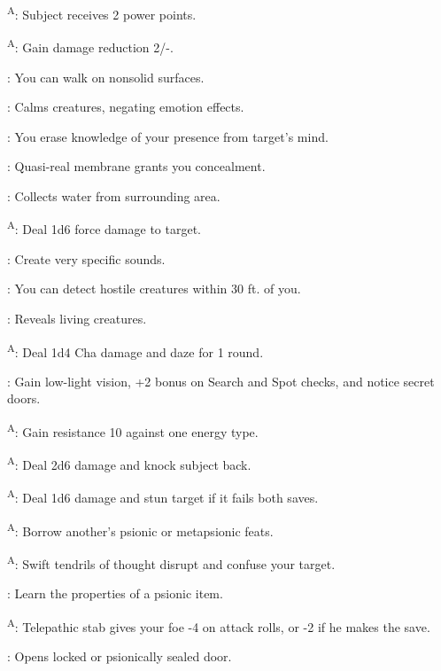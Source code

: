 \textsuperscript{A}: Subject receives 2 power points.

\textsuperscript{A}: Gain damage reduction 2/-.

: You can walk on nonsolid surfaces.

: Calms creatures, negating emotion effects.

: You erase knowledge of your presence from target’s mind.

: Quasi-real membrane grants you concealment.

: Collects water from surrounding area.

\textsuperscript{A}: Deal 1d6 force damage to target.

: Create very specific sounds.

: You can detect hostile creatures within 30 ft. of you.

: Reveals living creatures.

\textsuperscript{A}: Deal 1d4 Cha damage and daze for 1 round.

: Gain low-light vision, +2 bonus on Search and Spot checks, and notice secret doors.

\textsuperscript{A}: Gain resistance 10 against one energy type.

\textsuperscript{A}: Deal 2d6 damage and knock subject back.

\textsuperscript{A}: Deal 1d6 damage and stun target if it fails both saves.

\textsuperscript{A}: Borrow another’s psionic or metapsionic feats.

\textsuperscript{A}: Swift tendrils of thought disrupt and confuse your target.

: Learn the properties of a psionic item.

\textsuperscript{A}: Telepathic stab gives your foe -4 on attack rolls, or -2 if he makes the save.

: Opens locked or psionically sealed door.

